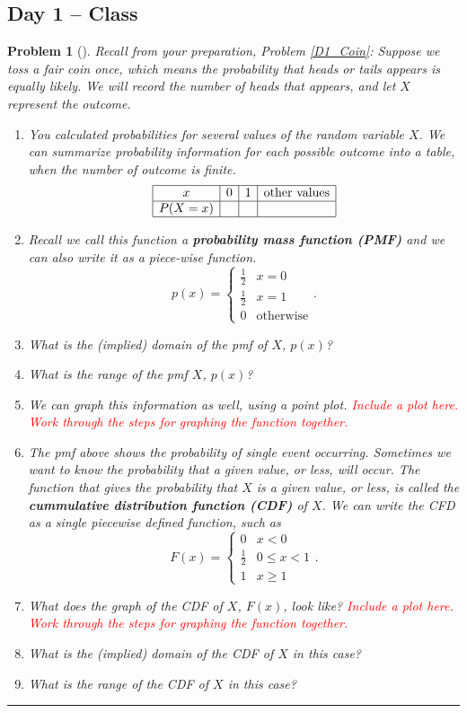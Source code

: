 \documentclass[letterpaper,oneside]{book}%
\theoremstyle{plain}
\theoremstyle{box}
\theoremstyle{problem}
\newtheorem{problemnum}{Problem}[chapter]
\newenvironment{problem}[1][]{\begin{problemnum}[#1]}{\end{problemnum}\nopagebreak\hrule\bigskip}
\begin{document}
\subsection{Day 1 -- Class}
\begin{problem}
\label{D1_CoinContinued}
Recall from your preparation, Problem \ref{D1_Coin}: Suppose we toss a fair coin once, which means the probability that heads or tails appears is equally likely. 
We will record the number of heads that appears, and let $X$ represent the outcome. 
 \begin{enumerate}
  \item You calculated probabilities for several values of the random variable $X$.
We can summarize probability information for each possible outcome into a table, when the number of outcome is finite. 
    $$\begin{array}{|c|c|c|c|}\hline
    x & 0 & 1 & \text{other values}\\ \hline
    P(X=x) & & & \\ \hline
    \end{array}$$
    \item Recall we call this function a \textbf{probability mass function (PMF)} and we can also write it as a piece-wise function.
      $$p(x) = 
    \begin{cases}
    \frac{1}{2} & x=0 \\
    \frac{1}{2} & x=1 \\
    0 & \text{otherwise}
    \end{cases}.$$
    \item What is the (implied) domain of the pmf of $X$, $p(x)$? 
    \item What is the range of the pmf $X$, $p(x)$?
  \item We can graph this information as well, using a point plot. \textcolor{red}{Include a plot here. Work through the steps for graphing the function together.} 
  \item The pmf above shows the probability of single event occurring. Sometimes we want to know the probability that a given value, or less, will occur. The function that gives the probability that $X$ is a given value, or less, is called the \textbf{cummulative distribution function (CDF)} of $X$. We can write the CFD as a single piecewise defined function, such as
    $$F(x) = 
    \begin{cases}
    0 & x<0 \\
    \frac{1}{2} &0\leq x<1 \\
    1 & x \geq 1
    \end{cases}.$$
  \item What does the graph of the CDF of $X$, $F(x)$, look like? \textcolor{red}{Include a plot here. Work through the steps for graphing the function together.} 
  \item What is the (implied) domain of the CDF of $X$ in this case?  
  \item What is the range of the CDF of $X$ in this case?  
 \end{enumerate}
\end{problem}
\end{document}
